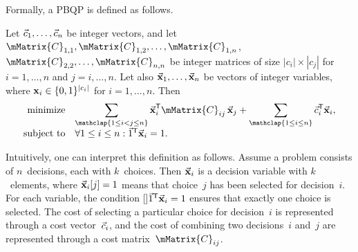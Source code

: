 Formally, a \gls{PBQP} is defined as follows.
%
\begin{definition}[PBQP]
  Let \mbox{$\vec{c}_1, \ldots, \vec{c}_n$} be integer vectors, and let
  \mbox{$\mMatrix{C}_{1,1}, \mMatrix{C}_{1,2}, \ldots, \mMatrix{C}_{1,n}$},
  \mbox{$\mMatrix{C}_{2,2}, \ldots, \mMatrix{C}_{n,n}$}
  be integer matrices of size \mbox{$|c_i| \times |c_j|$} for \mbox{$i = 1,
    \ldots, n$} and \mbox{$j = i, \ldots, n$}.
  Let also \mbox{$\mVector{\mVar{x}}_1, \ldots, \mVector{\mVar{x}}_n$} be
  vectors of integer \glspl{variable}, where \mbox{$\mVar{x}_i \in \mSet{0,
      1}^{|c_i|}$} for \mbox{$i = 1, \ldots, n$}.
  Then
  \begin{displaymath}
    \begin{array}{rl}
      \text{minimize}
        & \displaystyle
          \sum_{\mathclap{1 \leq i < j \leq n}}
          \mVector{\mVar{x}}_i^{\transp} \mMatrix{C}_{ij} \, \mVector{\mVar{x}}_j +
          \sum_{\mathclap{1 \leq i \leq n}}
          \mVector{c}_i^{\transp} \mVector{\mVar{x}}_i, \\
      \text{subject to}
        & \forall 1 \leq i \leq n :
          \mVector{1}^{\transp} \mVector{\mVar{x}}_i = 1. \\
    \end{array}
  \end{displaymath}
\end{definition}

Intuitively, one can interpret this definition as follows.
%
Assume a problem consists of $n$~decisions, each with $k$~choices.
%
Then $\mVector{\mVar{x}}_i$ is a \gls{decision variable} with $k$~elements,
where \mbox{$\mVector{\mVar{x}}_i[j] = 1$} means that choice~$j$ has been
selected for decision~$i$.
%
For each \gls{variable}, the condition
\raisebox{0pt}[\height-2pt]{$\mVector{1}^{\transp} \mVector{\mVar{x}}_i = 1$}
ensures that exactly one choice is selected.
%
The cost of selecting a particular choice for decision~$i$ is represented
through a cost vector~$\vec{c}_i$, and the cost of combining two
decisions~$i$ and~$j$ are represented through a cost matrix~$\mMatrix{C}_{ij}$.

